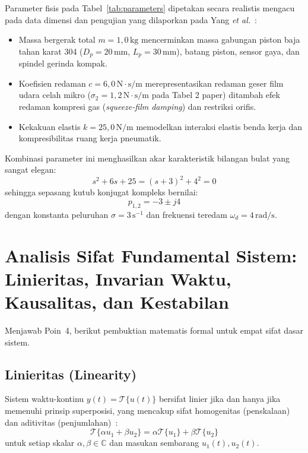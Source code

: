 \documentclass[journal]{IEEEtran}
\begin{document}
Parameter fisis pada Tabel~\ref{tab:parameters} dipetakan secara realistis mengacu pada data dimensi dan pengujian yang dilaporkan pada Yang \textit{et al.}~\cite{yang2026signal}:
\begin{itemize}
    \item Massa bergerak total $m = 1{,}0\,\text{kg}$ mencerminkan massa gabungan piston baja tahan karat 304 ($D_p = 20\,\text{mm}$, $L_p = 30\,\text{mm}$), batang piston, sensor gaya, dan spindel gerinda kompak.
    \item Koefisien redaman $c = 6{,}0\,\text{N}\cdot\text{s/m}$ merepresentasikan redaman geser film udara celah mikro ($\sigma_2 = 1{,}2\,\text{N}\cdot\text{s/m}$ pada Tabel 2 paper) ditambah efek redaman kompresi gas (\textit{squeeze-film damping}) dan restriksi orifis.
    \item Kekakuan elastis $k = 25{,}0\,\text{N/m}$ memodelkan interaksi elastis benda kerja dan kompresibilitas ruang kerja pneumatik.
\end{itemize}
Kombinasi parameter ini menghasilkan akar karakteristik bilangan bulat yang sangat elegan:
\begin{equation}
    s^2 + 6s + 25 = (s + 3)^2 + 4^2 = 0
\end{equation}
sehingga sepasang kutub konjugat kompleks bernilai:
\begin{equation}
    p_{1,2} = -3 \pm j4
    \label{eq:poles_exact}
\end{equation}
dengan konstanta peluruhan $\sigma = 3\,\text{s}^{-1}$ dan frekuensi teredam $\omega_d = 4\,\text{rad/s}$.

\section{Analisis Sifat Fundamental Sistem: Linieritas, Invarian Waktu, Kausalitas, dan Kestabilan}
Menjawab Poin~4, berikut pembuktian matematis formal untuk empat sifat dasar sistem.

\subsection{Linieritas (Linearity)}
Sistem waktu-kontinu $y(t) = \mathcal{T}\{u(t)\}$ bersifat linier jika dan hanya jika memenuhi prinsip superposisi, yang mencakup sifat homogenitas (penskalaan) dan aditivitas (penjumlahan)~\cite{oppenheim1997signals}:
\begin{equation}
    \mathcal{T}\{\alpha u_1 + \beta u_2\} = \alpha \mathcal{T}\{u_1\} + \beta \mathcal{T}\{u_2\}
    \label{eq:linearity_def}
\end{equation}
untuk setiap skalar $\alpha, \beta \in \mathbb{C}$ dan masukan sembarang $u_1(t), u_2(t)$.
\end{document}
